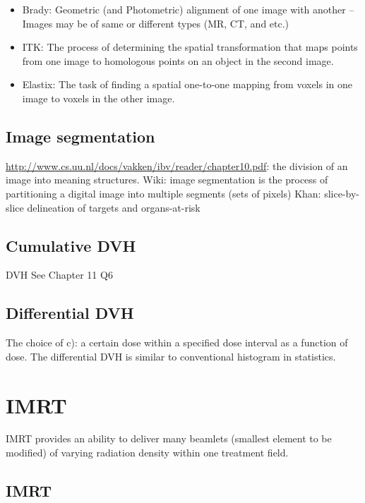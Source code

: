 \documentclass[]{book}
\providecommand{\tightlist}{%
  \setlength{\itemsep}{0pt}\setlength{\parskip}{0pt}}
\theoremstyle{definition}
\theoremstyle{definition}
\theoremstyle{definition}
\theoremstyle{remark}
\begin{document}
\begin{itemize}
\tightlist
\item
  Brady: Geometric (and Photometric) alignment of one image with another
  -- Images may be of same or different types (MR, CT, and etc.)
\item
  ITK: The process of determining the spatial transformation that maps
  points from one image to homologous points on an object in the second
  image.
\item
  Elastix: The task of finding a spatial one-to-one mapping from voxels
  in one image to voxels in the other image.
\end{itemize}

\section{Image segmentation}\label{image-segmentation}

\url{http://www.cs.uu.nl/docs/vakken/ibv/reader/chapter10.pdf}: the
division of an image into meaning structures. Wiki: image segmentation
is the process of partitioning a digital image into multiple segments
(sets of pixels) Khan: slice-by-slice delineation of targets and
organs-at-risk

\section{Cumulative DVH}\label{cumulative-dvh}

DVH See Chapter 11 Q6

\section{Differential DVH}\label{differential-dvh}

The choice of c): a certain dose within a specified dose interval as a
function of dose. The differential DVH is similar to conventional
histogram in statistics.

\chapter{IMRT}\label{imrt}

IMRT provides an ability to deliver many beamlets (smallest element to
be modified) of varying radiation density within one treatment field.

\section{IMRT}\label{imrt}
\end{document}
